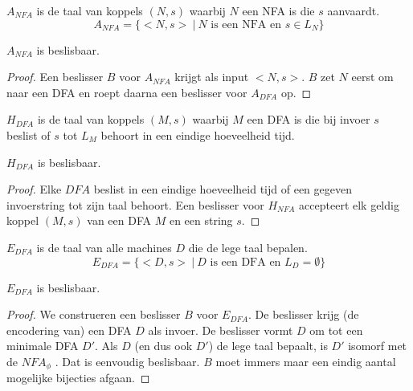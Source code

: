 \documentclass[main.tex]{subfiles}
\begin{document}
\begin{de}
  \label{de:a-nfa}
  $A_{NFA}$ is de taal van koppels $(N,s)$ waarbij $N$ een NFA is die $s$ aanvaardt.
  \[ A_{NFA} = \{ <N,s> \ |\ N \text{ is een NFA en } s \in L_{N} \} \]
\end{de}

\begin{st}
  \label{st-a-nfa-besl}
  $A_{NFA}$ is beslisbaar.

  \begin{proof}
    Een beslisser $B$ voor $A_{NFA}$ krijgt als input $<N,s>$.
    $B$ zet $N$ eerst om naar een DFA en roept daarna een beslisser voor $A_{DFA}$ op.
  \end{proof}
\end{st}

\begin{de}
  \label{de:h-dfa}
  $H_{DFA}$ is de taal van koppels $(M,s)$ waarbij $M$ een DFA is die bij invoer $s$ beslist of $s$ tot $L_{M}$ behoort in een eindige hoeveelheid tijd.
\end{de}

\begin{st}
  \label{st:h-dfa-besl}
  $H_{DFA}$ is beslisbaar.
  
  \begin{proof}
    Elke $DFA$ beslist in een eindige hoeveelheid tijd of een gegeven invoerstring tot zijn taal behoort.
    Een beslisser voor $H_{NFA}$ accepteert elk geldig koppel $(M,s)$ van een DFA $M$ en een string $s$.
  \end{proof}
\end{st}

\begin{de}
  \label{de:e-dfa}
  $E_{DFA}$ is de taal van alle machines $D$ die de lege taal bepalen.
  \[ E_{DFA} = \{ <D,s>\ |\ D \text{ is een DFA en } L_{D} = \emptyset \} \]
\end{de}

\begin{st}
  \label{st:e-dfa-besl}
  $E_{DFA}$ is beslisbaar.

  \begin{proof}
    We construeren een beslisser $B$ voor $E_{DFA}$.
    De beslisser krijg (de encodering van) een DFA $D$ als invoer.
    De beslisser vormt $D$ om tot een minimale DFA $D'$.
    Als $D$ (en dus ook $D'$) de lege taal bepaalt, is $D'$ isomorf met de $NFA_{\phi}$ .
    Dat is eenvoudig beslisbaar. $B$ moet immers maar een eindig aantal mogelijke bijecties afgaan.
  \end{proof}
\end{st}
\end{document}
